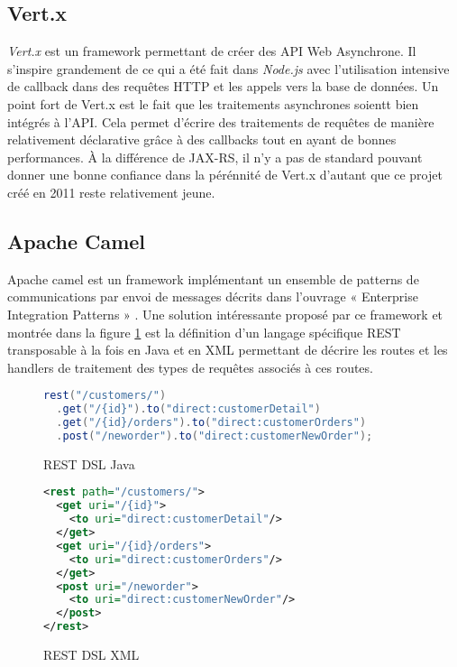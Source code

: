 \documentclass[a4paper, 11pt]{report}
\begin{document}
\subsection{Vert.x}

\emph{Vert.x} est un framework permettant de créer des API Web
Asynchrone. Il s'inspire grandement de ce qui a été fait dans
\emph{Node.js} avec l'utilisation intensive de callback dans des
requêtes HTTP et les appels vers la base de données. Un point fort de
Vert.x est le fait que les traitements asynchrones soientt bien intégrés à
l'API. Cela permet d'écrire des traitements de requêtes de manière
relativement déclarative grâce à des callbacks tout en ayant de bonnes
performances. À la différence de JAX-RS, il n'y a pas de standard
pouvant donner une bonne confiance dans la pérénnité de Vert.x
d'autant que ce projet créé en 2011 reste relativement jeune.

\subsection{Apache Camel}

Apache camel est un framework implémentant un ensemble de patterns de
communications par envoi de messages décrits dans l'ouvrage «
Enterprise Integration Patterns » \cite{hohpe2003enterprise}. Une
solution intéressante proposé par ce framework et montrée dans la
figure \ref{fig:restdsl} est la définition d'un langage spécifique
REST transposable à la fois en Java et en XML permettant de décrire
les routes et les handlers de traitement des types de requêtes
associés à ces routes.

\begin{figure}
  \ContinuedFloat*
  \begin{lstlisting}[language=java]
rest("/customers/")
  .get("/{id}").to("direct:customerDetail")
  .get("/{id}/orders").to("direct:customerOrders")
  .post("/neworder").to("direct:customerNewOrder");
  \end{lstlisting}
  \caption{REST DSL Java}
\end{figure}

\begin{figure}
  \ContinuedFloat
  \begin{lstlisting}[language=xml]
<rest path="/customers/">
  <get uri="/{id}">
    <to uri="direct:customerDetail"/>
  </get>
  <get uri="/{id}/orders">
    <to uri="direct:customerOrders"/>
  </get>
  <post uri="/neworder">
    <to uri="direct:customerNewOrder"/>
  </post>
</rest>
  \end{lstlisting}
  \caption{REST DSL XML}
  \label{fig:restdsl}
\end{figure}
\end{document}
